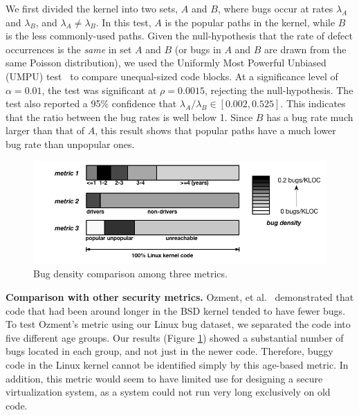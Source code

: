 We first divided the kernel into two sets,
$A$ and $B$, where bugs occur at rates $\lambda_A$ and
$\lambda_B$, and $\lambda_A \neq \lambda_B$. In this test, $A$ is the popular
paths in the kernel, while $B$
is the less commonly-used paths. Given the null-hypothesis
that the rate of defect occurrences is the \textit{same} in set $A$ and $B$
(or bugs in $A$ and $B$ are drawn from the same Poisson distribution),
we used the Uniformly Most Powerful Unbiased (UMPU) test~\cite{shiue1982experiment}
to compare unequal-sized code blocks.
At a significance level of $\alpha=0.01$, the test was significant at
$\rho=0.0015$, rejecting the null-hypothesis.
The test also reported a 95\% confidence that $\lambda_A / \lambda_B
\in [0.002, 0.525]$. This indicates that the ratio between the bug rates is well
below 1. Since $B$ has a bug rate much larger than that of $A$, 
%
this result shows that
popular paths have a much lower bug rate than unpopular ones.



\begin{figure}
\centering
\includegraphics[width=1.1\columnwidth]{diagram/bug_density_v2.png}
\caption{\small Bug density comparison among three metrics.}
\label{fig:bug_density}
\end{figure}

{\bf Comparison with other security metrics.}
Ozment, et al.~\cite{ozment2006milk} demonstrated that code that
had been around longer in the BSD kernel tended to have fewer bugs.
To test Ozment's metric using our Linux bug dataset,
we separated the code into five different age groups. 
Our results (Figure \ref{fig:bug_density}) showed a substantial
number of bugs located in each group, and not just in the newer code.
Therefore, buggy code in the Linux kernel cannot be identified simply
by this age-based metric.
In addition, this metric would seem to have limited use for designing a secure
virtualization system, 
as a system could not run very long exclusively on old code.

